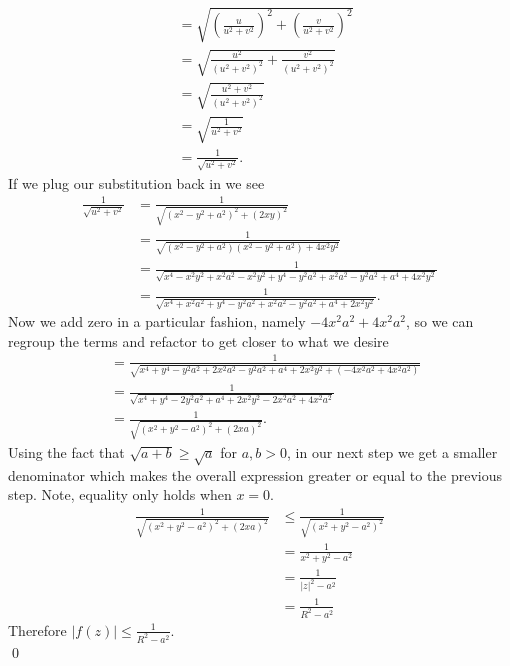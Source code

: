 \documentclass[10pt]{amsart}
\theoremstyle{nonumberplain}
\begin{document}
\begin{enumerate}[label={\bf {\arabic*}:}]
\begin{align*}
	&= \sqrt{
		\left(\frac{u }{u^2 + v^2 }\right)^2 + \left(\frac{v }{u^2 + v^2 }\right)^2
	} \\
	&= \sqrt{
		\frac{u^2 }{\left( u^2 + v^2 \right)^2} + \frac{v^2 }{\left( u^2 + v^2 \right)^2}
	} \\
	&= \sqrt{
		\frac{u^2 + v^2 }{\left( u^2 + v^2 \right)^2}
	} \\
	&= \sqrt{
		\frac{1}{u^2 + v^2}
	} \\
	&= \frac{1}{\sqrt{u^2 + v^2}}.
\end{align*}
If we plug our substitution back in we see
\begin{align*}
\frac{1}{\sqrt{u^2 + v^2}} &= \frac{1}{\sqrt{\left(x^2 - y^2 + a^2 \right)^2 + \left(2xy \right)^2}} \\
	&= \frac{1}{\sqrt{\left(x^2 - y^2 + a^2 \right)\left(x^2 - y^2 + a^2 \right) + 4x^2y^2}} \\
	&= \frac{1}{
		\sqrt{
			x^4 - x^2y^2 + x^2a^2 -x^2y^2 + y^4 - y^2a^2 + x^2a^2 - y^2a^2 + a^4 + 4x^2y^2
		}
	} \\
	&= \frac{1}{
		\sqrt{
			x^4 + x^2a^2 + y^4 - y^2a^2 + x^2a^2 - y^2a^2 + a^4 + 2x^2y^2
		}
	}.
\end{align*}
Now we add zero in a particular fashion, namely $- 4x^2a^2 + 4x^2a^2 $, so we can regroup the terms and refactor to get closer to what we desire
\begin{align*}
	&= \frac{1}{
		\sqrt{
			x^4 + y^4 - y^2a^2 + 2x^2a^2 - y^2a^2 + a^4 + 2x^2y^2 +\left( - 4x^2a^2 + 4x^2a^2 \right)
		}
	} \\
	&= \frac{1}{
		\sqrt{
			x^4 + y^4 - 2y^2a^2 + a^4 + 2x^2y^2 - 2x^2a^2 + 4x^2a^2
		}
	} \\
	&= \frac{1}{\sqrt{\left(x^2 + y^2 - a^2\right)^2 + \left(2xa\right)^2}}.
\end{align*}
Using the fact that $\sqrt{a + b} \geq \sqrt{a}$ for $a, b > 0$, in our next step we get a smaller denominator which makes the overall expression greater or equal to the previous step. Note, equality only holds when $x=0$.
\begin{align*}
 \frac{1}{\sqrt{\left(x^2 + y^2 - a^2\right)^2 + \left(2xa\right)^2}}
 	&\leq \frac{1}{\sqrt{\left(x^2 + y^2 - a^2\right)^2}} \\
	&= \frac{1}{x^2 + y^2 - a^2} \\
	&= \frac{1}{|z|^2 - a^2} \\
	&= \frac{1}{R^2 - a^2}
\end{align*}
Therefore $\left| f(z) \right| \leq \frac{1}{R^2 - a^2}$. \\
\qed


\end{enumerate}
\end{document}
